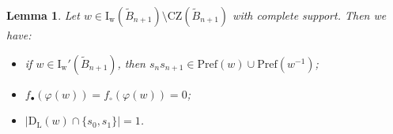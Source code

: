 \documentclass{amsart}
\newcommand{\B}{{\widetilde{B}_{n+1}}}
\newcommand{\ld}{{\mathrm{D}_{\mathrm{L}}}}
\newcommand{\pr}{\mathrm{Pref}}
\newcommand{\zz}{\mathrm{CZ}}
\newcommand{\IR}{\mathrm{I_w}}
\newcommand{\IRc}{\mathrm{I_w'}}
\newcommand{\nmap}{\varphi}
\newtheorem{Lemma}[Theorem]{Lemma}
\theoremstyle{definition}
\begin{document}

\begin{Lemma}
\label{lemma:lemmaBuno}
    Let $w\in \IR(\B) \setminus \zz(\B)$ with complete support. Then we have:
    \begin{itemize}
        \item[(a)] if $w\in \IRc(\B)$, then $s_{n}s_{n+1}\in \pr(w) \cup \pr(w^{-1})$;
        \item[(b)] $f_\bullet(\nmap(w))=f_\circ(\nmap(w))=0$;
        \item[(c)] $\left | \ld(w)\cap \{s_0,s_1\}\right |=1$. 
    \end{itemize}
\end{Lemma}
\end{document}
